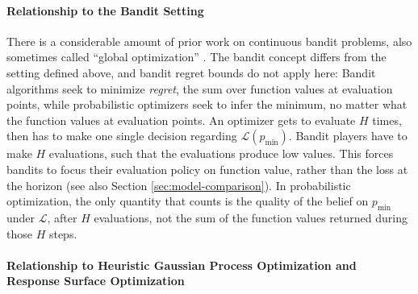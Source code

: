 \documentclass[twoside,11pt]{article}
\renewcommand{\L}{\mathcal{L}}
\newcommand{\pmin}{p_{\min}}
\begin{document}
\paragraph{Relationship to the Bandit Setting}
\label{sec:diff-band-sett}

There is a considerable amount of prior work on continuous bandit
problems, also sometimes called ``global optimization''
\citep[e.g.][]{kleinberg2005nearly,grunewalder2010regret,srinivasgaussian}. The
bandit concept differs from the setting defined above, and bandit
regret bounds do not apply here: Bandit algorithms seek to minimize
\emph{regret}, the sum over function values at evaluation points,
while probabilistic optimizers seek to infer the minimum, no matter
what the function values at evaluation points. An optimizer gets to
evaluate $H$ times, then has to make one single decision regarding
$\L(\pmin)$. Bandit players have to make $H$ evaluations, such that
the evaluations produce low values. This forces bandits to focus their
evaluation policy on function value, rather than the loss at the
horizon (see also Section \ref{sec:model-comparison}). In
probabilistic optimization, the only quantity that counts is the
quality of the belief on $\pmin$ under $\L$, after $H$ evaluations,
not the sum of the function values returned during those $H$
steps.

\paragraph{Relationship to Heuristic Gaussian Process Optimization and
Response Surface Optimization}
\label{sec:relat-heur-gauss}
\end{document}
